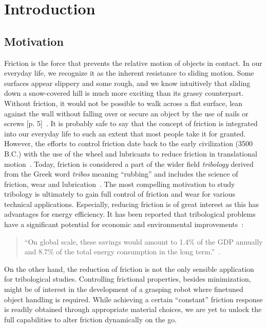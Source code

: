 \chapter{Introduction}


\section{Motivation}
Friction is the force that prevents the relative motion of objects in contact.
In our everyday life, we recognize it as the inherent resistance to sliding
motion. Some surfaces appear slippery and some rough, and we know intuitively
that sliding down a snow-covered hill is much more exciting than its grassy
counterpart. Without friction, it would not be possible to walk across a flat
surface, lean against the wall without falling over or secure an object by the
use of nails or screws [p. 5]~\cite{gnecco_meyer_2015}. It is probably safe to
say that the concept of friction is integrated into our everyday life to such an
extent that most people take it for granted. However, the efforts to control
friction date back to the early civilization (3500 B.C.) with the use of the
wheel and lubricants to reduce friction in translational
motion~\cite{bhushan_2013}. Today, friction is considered a part of the wider
field \textit{tribology} derived from the Greek word \textit{tribos} meaning
``rubbing'' and includes the science of friction, wear and
lubrication~\cite{bhushan_2013}. The most compelling motivation to study
tribology is ultimately to gain full control of friction and wear for various
technical applications. Especially, reducing friction is of great interest as
this has advantages for energy efficiency. It has been reported that
tribological problems have a significant potential for economic and
environmental improvements~\cite{kim_nano-scale_2009}:
\begin{quote}
    ``On global scale, these savings would amount to 1.4\% of the GDP annually
    and 8.7\% of the total energy consumption in the long
    term.''~\cite{holmberg_influence_2017}. 
\end{quote}
On the other hand, the reduction of friction is not the only sensible
application for tribological studies. Controlling frictional properties, besides
minimization, might be of interest in the development of a grasping robot where
finetuned object handling is required. While achieving a certain ``constant''
friction response is readily obtained through appropriate material choices, we
are yet to unlock the full capabilities to alter friction dynamically on the go.
